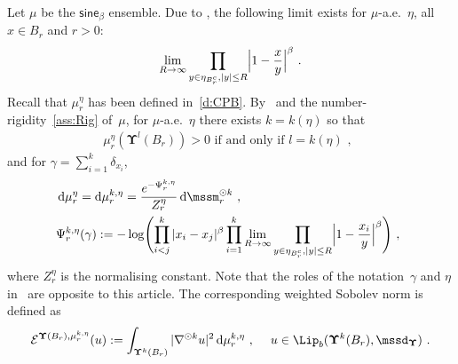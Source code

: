\documentclass[11pt,letterpaper]{amsart}
\newcommand{\diff}{\mathop{}\!\mathrm{d}}
\newcommand{\comma}{\,\,\mathrm{,}\;\,}
\newcommand{\fstop}{\,\,\mathrm{.}}
\newcommand{\QP}{{\mu}}
\newcommand{\dUpsilon}{{\mathbf \Upsilon}}
\newcommand{\U}{\dUpsilon}
\newcommand{\sine}{\mathsf{sine}}
\newcommand{\E}{\mathcal E}
\renewcommand{\1}{\mathbf 1}
\numberwithin{equation}{section}
\theoremstyle{plain}
\theoremstyle{definition}
\theoremstyle{remark}
\begin{document}
Let $\QP$ be the $\sine_\beta$ ensemble. Due to \cite[Thm. 1.1]{DerHarLebMai20}, the following limit exists for $\QP$-a.e.~$\eta$, all $x \in B_r$ and $r>0$:
$$\lim_{R \to \infty}\prod_{y \in \eta_{B_r^c}, |y| \le R} \Bigl|1-\frac{x}{y}\Bigr|^\beta  \fstop$$
Recall that $\QP_r^\eta$ has been defined in~\eqref{d:CPB}.  By~\cite[Thm. 1.1]{DerHarLebMai20} and the number-rigidity~\ref{ass:Rig} of~$\QP$, 
for $\mu$-a.e.~$\eta$ there exists $k=k(\eta)$  so that 
\begin{align} \label{e:R1}
\text{$\mu_{r}^{\eta}(\U^l(B_r))>0$ if and only if $l=k(\eta)$} \comma
\end{align}%
and for $\gamma=\sum_{i=1}^k \delta_{x_i}$, 
\begin{align} \label{d:cp}
&\diff \mu_{r}^{\eta} = \diff \mu_{r}^{k, \eta}=\frac{e^{-\Psi^{k, \eta}_{r}}}{Z_{r}^\eta} \diff \mssm_r^{\odot k}  \comma
\\
& \Psi_{r}^{k, \eta}(\gamma) := - \log \Biggl(  \prod_{i<j}^k |x_i-x_j|^\beta \prod_{i=1}^k\lim_{R \to \infty}\prod_{y \in \eta_{B_r^c}, |y| \le R} \Bigl|1-\frac{x_i}{y}\Bigr|^\beta\Biggr) \comma \notag
\end{align}
where $Z_r^\eta$ is the normalising constant. Note that the roles of the notation~$\gamma$ and $\eta$ in~\cite{DerHarLebMai20} are opposite to this article.  
The corresponding weighted Sobolev norm is defined as 
\begin{align} \label{eq:form2}
\E^{\U(B_r), \mu_{r}^{k, \eta}}(u) := \int_{\U^k(B_r)} |\nabla^{\odot k} u|^2 \diff \mu_{r}^{k, \eta} \comma \quad u \in \Lip_b(\U^k(B_r), \mssd_{\U}) \fstop 
\end{align}
\end{document}
